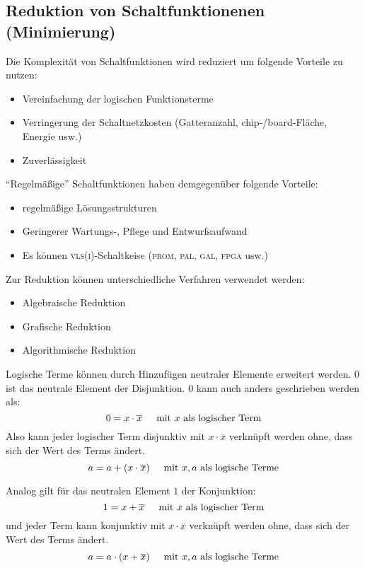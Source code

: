 \subsection{Reduktion von Schaltfunktionenen (Minimierung)}
Die Komplexität von Schaltfunktionen wird reduziert um folgende Vorteile zu nutzen:
\begin{itemize}
	\item
		Vereinfachung der logischen Funktionsterme
	\item
		Verringerung der Schaltnetzkosten (Gatteranzahl, chip-/board-Fläche, Energie usw.)
	\item
		Zuverlässigkeit
\end{itemize}
"`Regelmäßige"' Schaltfunktionen haben demgegenüber folgende Vorteile:
\begin{itemize}
  \item regelmäßige Lösungsstrukturen
  \item Geringerer Wartungs-, Pflege und Entwurfsaufwand
  \item Es können \textsc{vls(i)}-Schaltkeise (\textsc{prom}, \textsc{pal}, \textsc{gal}, \textsc{fpga} usw.)
\end{itemize}
Zur Reduktion können unterschiedliche Verfahren verwendet werden:
\begin{itemize}
  \item Algebraische Reduktion
  \item Grafische Reduktion
  \item Algorithmische Reduktion
\end{itemize}

Logische Terme können durch Hinzufügen neutraler Elemente erweitert werden. $0$ ist das neutrale Element der Disjunktion. $0$ kann auch anders geschrieben werden als: 
$$ 
	0 = x \cdot \overline{x} \hspace{5mm} \textnormal{mit } x \textnormal{ als logischer Term}
$$
Also kann jeder logischer Term disjunktiv mit $x \cdot \overline{x}$ verknüpft werden ohne, dass sich der Wert des Terms ändert.
$$ 
	a = a + (x \cdot \overline{x}) \hspace{5mm} \textnormal{mit } x, a \textnormal{ als logische Terme}
$$

Analog gilt für das neutralen Element $1$ der Konjunktion:
$$
	1 = x + \overline{x} \hspace{5mm} \textnormal{mit } x \textnormal{ als logischer Term}
$$
und jeder Term kann konjunktiv mit $x \cdot \overline{x}$ verknüpft werden ohne, dass sich der Wert des Terms ändert.
$$ 
	a = a \cdot (x + \overline{x}) \hspace{5mm} \textnormal{mit } x, a \textnormal{ als logische Terme}
$$

